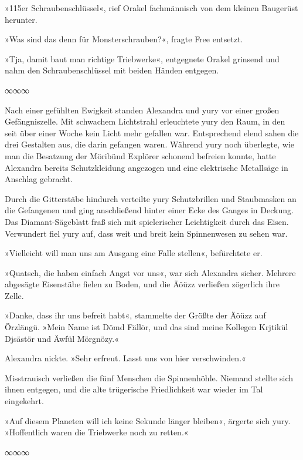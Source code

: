 »115er Schraubenschlüssel«, rief Orakel fachmännisch von dem kleinen Baugerüst herunter.

»Was sind das denn für Monsterschrauben?«, fragte Free entsetzt.

»Tja, damit baut man richtige Triebwerke«, entgegnete Orakel grinsend und nahm den Schraubenschlüssel mit beiden Händen entgegen.

\begin{center}
    ∞∞∞
\end{center}

Nach einer gefühlten Ewigkeit standen Alexandra und yury vor einer großen Gefängniszelle. Mit schwachem Lichtstrahl erleuchtete yury den Raum, in den seit über einer Woche kein Licht mehr gefallen war. Entsprechend elend sahen die drei Gestalten aus, die darin gefangen waren. Während yury noch überlegte, wie man die Besatzung der Möribünd Explörer schonend befreien konnte, hatte Alexandra bereits Schutzkleidung angezogen und eine elektrische Metallsäge in Anschlag gebracht.

Durch die Gitterstäbe hindurch verteilte yury Schutzbrillen und Staubmasken an die Gefangenen und ging anschließend hinter einer Ecke des Ganges in Deckung. Das Diamant-Sägeblatt fraß sich mit spielerischer Leichtigkeit durch das Eisen. Verwundert fiel yury auf, dass weit und breit kein Spinnenwesen zu sehen war.

»Vielleicht will man uns am Ausgang eine Falle stellen«, befürchtete er.

»Quatsch, die haben einfach Angst vor uns«, war sich Alexandra sicher. Mehrere abgesägte Eisenstäbe fielen zu Boden, und die Äöüzz verließen zögerlich ihre Zelle.

»Danke, dass ihr uns befreit habt«, stammelte der Größte der Äöüzz auf Örzlängü. »Mein Name ist Dömd Fällör, und das sind meine Kollegen Krjtikül Djsästör und Äwfül Mörgnözy.«

Alexandra nickte. »Sehr erfreut. Lasst uns von hier verschwinden.«

Misstrauisch verließen die fünf Menschen die Spinnenhöhle. Niemand stellte sich ihnen entgegen, und die alte trügerische Friedlichkeit war wieder im Tal eingekehrt.

»Auf diesem Planeten will ich keine Sekunde länger bleiben«, ärgerte sich yury. »Hoffentlich waren die Triebwerke noch zu retten.«

\begin{center}
    ∞∞∞
\end{center}


